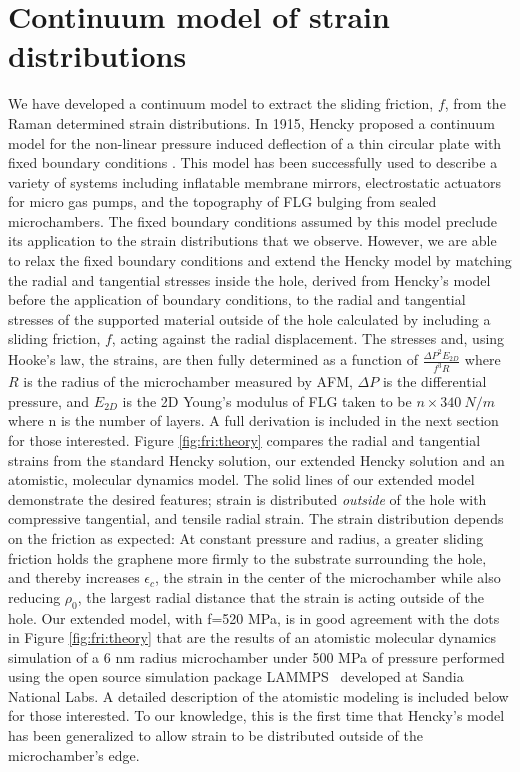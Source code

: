 \section{Continuum model of strain distributions}
We have developed a continuum model to extract the sliding friction, $f$, from the Raman determined strain distributions.
In 1915, Hencky proposed a continuum model for the non-linear pressure induced deflection of a thin circular plate with fixed boundary conditions \cite{Hencky1915,Fichter1997}.
This model has been successfully used to describe a variety of systems including inflatable membrane mirrors\cite{Meinel2000}, electrostatic actuators for micro gas pumps\cite{Zhang2011b}, and the topography of FLG bulging from sealed microchambers\cite{Koenig2011}.
The fixed boundary conditions assumed by this model preclude its application to the strain distributions that we observe.
However, we are able to relax the fixed boundary conditions and extend the Hencky model by matching the radial and tangential stresses inside the hole, derived from Hencky's model before the application of boundary conditions, to the radial and tangential stresses of the supported material outside of the hole calculated by including a sliding friction, $f$, acting against the radial displacement.
The stresses and, using Hooke's law, the strains, are then fully determined as a function of $\frac{\Delta P^2 E_{2D}}{f^3 R}$ where $R$ is the radius of the microchamber measured by AFM, $\Delta P$ is the differential pressure, and $E_{2D}$ is the 2D Young's modulus of FLG taken to be $n \times 340 \ N/m$ where n is the number of layers\cite{Lee2008,Koenig2011}.
A full derivation is included in the next section for those interested.
Figure \ref{fig:fri:theory} compares the radial and tangential strains from the standard Hencky solution, our extended Hencky solution and an atomistic, molecular dynamics model.
The solid lines of our extended model demonstrate the desired features; strain is distributed \emph{outside} of the hole with compressive tangential, and tensile radial strain.
The strain distribution depends on the friction as expected: At constant pressure and radius, a greater sliding friction holds the graphene more firmly to the substrate surrounding the hole, and thereby increases $\epsilon_c$, the strain in the center of the microchamber while also reducing $\rho_0$, the largest radial distance that the strain is acting outside of the hole.
Our extended model, with f=520 MPa, is in good agreement with the dots in Figure \ref{fig:fri:theory} that are the results of an atomistic molecular dynamics simulation of a 6 nm radius microchamber under 500 MPa of pressure performed using the open source simulation package LAMMPS~\cite{plimptonLAMMPS,PlimptonJCP1995} developed at Sandia National Labs.
A detailed description of the atomistic modeling is included below for those interested.
To our knowledge, this is the first time that Hencky's model has been generalized to allow strain to be distributed outside of the microchamber's edge.

